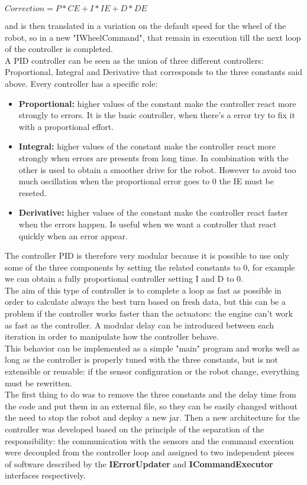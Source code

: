 \documentclass{llncs}
\begin{document}
\begin{center}
$ Correction = P*CE + I*IE + D*DE $\\
\end{center}
and is then translated in a variation on the default speed for the wheel of the robot, so in a new "IWheelCommand", that remain in execution till the next loop of the controller is completed.\\
A PID controller can be seen as the union of three different controllers: Proportional, Integral and Derivative that corresponds to the three constants said above. Every controller has a specific role:
\begin{itemize}
	\item \textbf{Proportional: } higher values of the constant make the controller react more strongly to errors. It is the basic controller, when there's a error try to fix it with a proportional effort.
	\item \textbf{Integral: } higher values of the constant make the controller react more strongly when errors are presents from long time. In combination with the other is used to obtain a smoother drive for the robot. However to avoid too much oscillation when the proportional error goes to 0 the IE must be reseted.
	\item \textbf{Derivative: } higher values of the constant make the controller react faster when the errors happen. Is useful when we want a controller that react quickly when an error appear. 
\end{itemize}
\noindent The controller PID is therefore very modular because it is possible to use only some of the three components by setting the related constants to 0, for example we can obtain a fully proportional controller setting I and D to 0.\\
The aim of this type of controller is to complete a loop as fast as possible in order to calculate always the best turn based on fresh data, but this can be a problem if the controller works faster than the actuators: the engine can't work as fast as the controller. A modular delay can be introduced between each iteration in order to manipulate how the controller behave.\\
This behavior can be implemented as a simple "main" program and works well as long as the controller is properly tuned with the three constants, but is not extensible or reusable: if the sensor configuration or the robot change, everything must be rewritten.\\
The first thing to do was to remove the three constants and the delay time from the code and put them in an external file, so they can be easily changed without the need to stop the robot and deploy a new jar. Then a new architecture for the controller was developed based on the principle of the separation of the responsibility: the communication with the sensors and the command execution were decoupled from the controller loop and assigned to two independent pieces of software described by the \textbf{IErrorUpdater} and \textbf{ICommandExecutor} interfaces respectively.
\begin{center}
\end{center}
\end{document}
